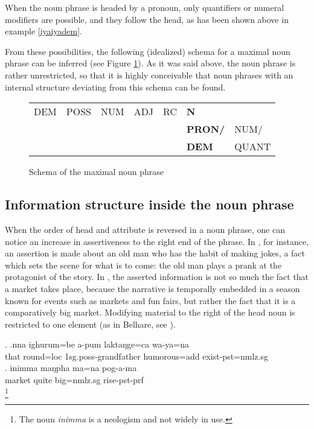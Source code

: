  When the noun phrase is headed by a pronoun, only quantifiers or numeral modifiers are possible, and they follow the head, as has been shown above in example \ref{iyaiyadem}.
 
 
From these possibilities, the following (idealized) schema for a maximal noun phrase can be inferred (see Figure \ref{np-max}). As it was said above, the noun phrase is rather unrestricted, so that it is highly conceivable that noun phrases with an internal structure deviating from this schema can be found.
 	 
\begin{figure}[htp]
\begin{centering}
\begin{tabular}{lllllll}
\toprule
DEM&POSS&NUM&ADJ&RC&\textbf{N}&\\ 
&&&&&\textbf{PRON/}&NUM/\\
&&&&&\textbf{DEM}&QUANT\\
\bottomrule
\end{tabular} 
\caption{Schema of the maximal noun phrase}\label{np-max}
\end{centering}
\end{figure}
 

\subsection{Information structure inside the noun phrase}

When the order of head and attribute is reversed in a noun phrase, one can notice an increase in assertiveness to the right end of the phrase. In \Next[a], for instance, an assertion is made about an old man who has the habit of making jokes, a fact which sets the scene for what is to come: the old man plays a prank at the protagonist of the story. In \Next[b], the asserted information is not so much the fact that a market takes place, because the narrative is temporally embedded in a season known for events such as markets and fun fairs, but rather the fact that it is a comparatively big market. Modifying material to the right of the head noun is restricted to one element (as in Belhare, see \citet[562]{Bickel2003Belhare}).

\ex. \ag.nna  ighurum=be   a-pum                  laktaŋge=ca        wa-ya=na\\
that round{\sc =loc} {\sc 1sg.poss-}grandfather humorous{\sc =add} exist{\sc [3sg]-pst=nmlz.sg}\\
 
\bg. inimma maŋpha ma=na pog-a-ma\\
market quite big{\sc =nmlz.sg} rise{\sc [3sg]-pst-prf}\\
\footnote{The noun \emph{inimma} is a neologism and not widely in use.} 
  
